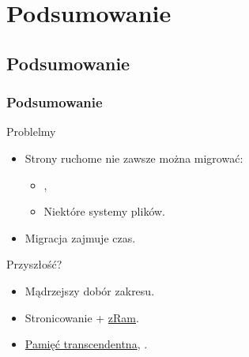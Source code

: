 \section{Podsumowanie}

\subsection{Podsumowanie}

\begin{frame}
  \frametitle{Podsumowanie}

  \begin{block}{Problelmy}
    \begin{itemize}
    \item Strony ruchome nie zawsze można migrować:
      \begin{itemize}
      \item {},
      \item Niektóre systemy plików.
      \end{itemize}
    \item Migracja zajmuje czas.
    \end{itemize}
  \end{block}

  \begin{block}{Przyszłość?}
    \begin{itemize}
    \item Mądrzejszy dobór zakresu.
    \item Stronicowanie + \href{http://code.google.com/p/compcache}{zRam}.
    \item \href{http://lwn.net/Articles/340080/}{Pamięć
      transcendentna}, \href{http://lwn.net/Articles/468896/}{}.
    \end{itemize}
  \end{block}
\end{frame}

